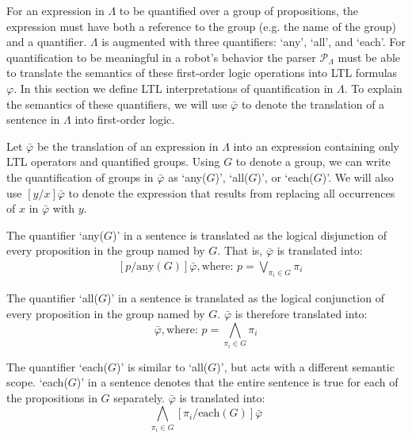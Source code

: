 For an expression in $\Lambda$ to be quantified over a group of propositions, the expression must have both a reference to the group (e.g. the name of the group) and a quantifier. 
$\Lambda$ is augmented with three quantifiers: `any', `all', and `each'. 
For quantification to be meaningful in a robot's behavior the parser $\mathcal{P}_{\Lambda}$ must be able to translate the semantics of these first-order logic operations into LTL formulas $\varphi$.
In this section we define LTL interpretations of quantification in $\Lambda$.  
To explain the semantics of these quantifiers, we will use $\bar{\varphi}$ to denote the translation of a sentence in $\Lambda$ into first-order logic. 
\par Let $\bar{\varphi}$ be the translation of an expression in $\Lambda$ into an expression containing only LTL operators and quantified groups. 
Using $G$ to denote a group, we can write the quantification of groups in $\bar{\varphi}$ as `any($G$)', `all($G$)', or `each($G$)'. 
We will also use $[y/x]\bar{\varphi}$ to denote the expression that results from replacing all occurrences of $x$ in $\bar{\varphi}$ with $y$. 
\par
The quantifier `any($G$)' in a sentence is translated as the logical disjunction of every proposition in the group named by $G$. 
That is, $\bar{\varphi}$ is translated into: 
\begin{align*}
	&[ p / \text{any}(G)] \bar{\varphi}, \text{where: } p = \bigvee \limits_{\pi_i \in G} \pi_i
\end{align*}
\par
The quantifier `all($G$)' in a sentence is translated as the logical conjunction of every proposition in the group named by $G$. 
$\bar{\varphi}$ is therefore translated into: 
\begin{equation*}
	[ p / \text{all}(G)] \bar{\varphi}, \text{where: } p = \bigwedge \limits_{\pi_i \in G} \pi_i
\end{equation*}
\par
The quantifier `each($G$)' is similar to `all($G$)', but acts with a different semantic scope. 
`each($G$)' in a sentence denotes that the entire sentence is true for each of the propositions in $G$ separately. 
$\bar{\varphi}$ is translated into:
\begin{equation*}
 	\bigwedge\limits_{\pi_i \in G} [\pi_i / \text{each}(G)] \bar{\varphi}
\end{equation*}
\par
